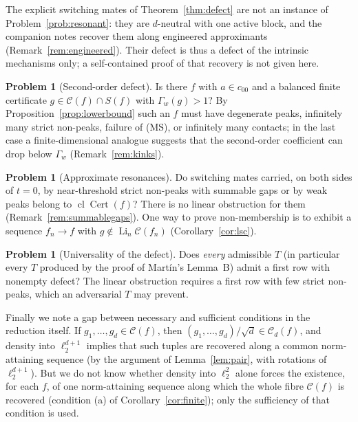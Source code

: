 \documentclass[10pt]{amsart}
\theoremstyle{definition}
\newtheorem{problem}[theorem]{Problem}
\theoremstyle{remark}
\newcommand{\Cset}{\mathcal C}
\newcommand{\Cert}{\operatorname{Cert}}
\newcommand{\Li}{\operatorname*{Li}}
\newcommand{\cl}{\operatorname{cl}}
\begin{document}
The explicit switching mates of Theorem~\ref{thm:defect} are not an
instance of Problem~\ref{prob:resonant}: they are $d$-neutral with one
active block, and the companion notes recover them along engineered
approximants (Remark~\ref{rem:engineered}).  Their defect is thus a defect
of the intrinsic mechanisms only; a self-contained proof of that recovery is
not given here.

\begin{problem}[Second-order defect]\label{prob:secondorder}
Is there $f$ with $a\in c_{00}$ and a balanced finite certificate
$g\in\Cset(f)\cap S(f)$ with $\Gamma_w(g)>1$?  By
Proposition~\ref{prop:lowerbound} such an $f$ must have degenerate peaks,
infinitely many strict non-peaks, failure of (MS), or infinitely many
contacts; in the last case a finite-dimensional analogue suggests that the
second-order coefficient can drop below $\Gamma_w$ (Remark~\ref{rem:kinks}).
\end{problem}

\begin{problem}[Approximate resonances]\label{prob:approx}
Do switching mates carried, on both sides of $t=0$, by near-threshold
strict non-peaks with summable gaps or by weak peaks belong to
$\cl\Cert(f)$?  There is no linear obstruction for them
(Remark~\ref{rem:summablegaps}).  One way to prove non-membership is to
exhibit a sequence $f_n\to f$ with $g\notin\Li_n\Cset(f_n)$
(Corollary~\ref{cor:lsc}).
\end{problem}

\begin{problem}[Universality of the defect]\label{prob:universal}
Does \emph{every} admissible $T$ (in particular every $T$ produced by the
proof of Mart\'in's Lemma~B) admit a first row with nonempty defect?  The
linear obstruction requires a first row with few strict non-peaks, which an
adversarial $T$ may prevent.
\end{problem}

Finally we note a gap between necessary and sufficient conditions in the
reduction itself.  If $g_1,\dots,g_d\in\Cset(f)$, then
$(g_1,\dots,g_d)/\sqrt d\in\Cset_d(f)$, and density into $\ell_2^{d+1}$
implies that such tuples are recovered along a common norm-attaining
sequence (by the argument of Lemma~\ref{lem:pair}, with rotations of
$\ell_2^{d+1}$).  But we do not
know whether density into $\ell_2^2$ alone forces the existence, for each
$f$, of one norm-attaining sequence along which the whole fibre $\Cset(f)$ is
recovered (condition (a) of Corollary~\ref{cor:finite}); only the
sufficiency of that condition is used.
\end{document}
